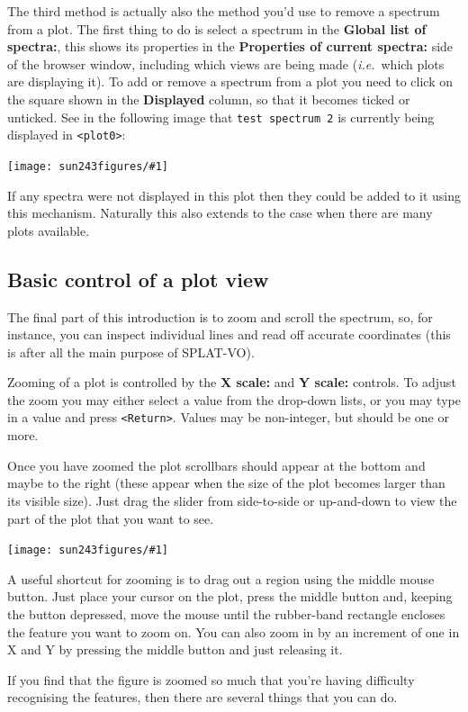 \documentclass[twoside,11pt]{article}
\newcommand{\htmladdimg}[1]{}
\newcommand{\latexhtml}[2]{#1}
\newcommand{\xlabel}[1]{}
\renewcommand{\_}{\texttt{\symbol{95}}}
\newcommand{\SPLAT}{\textsf{SPLAT-VO}}
\newcommand{\mainfigure}[1]
{\begin{center}
 \latexhtml{\texttt{[image: sun243\_figures/\#1]}}{\htmladdimg{#1.gif}}
 \end{center}
}
\newcommand{\labelitem}[1]{\textbf{#1}}
\newcommand{\hitext}[1]{\texttt{#1}}
\newcommand{\ie}{\textit{i.e.}}
\begin{document}
The third method is actually also the method you'd use to remove a
spectrum from a plot. The first thing to do is select a spectrum in the
\labelitem{Global list of spectra:},
this shows its properties in the
\labelitem{Properties of current spectra:}
side of the browser window, including which views
are being made (\ie\ which plots are displaying it). To add or remove
a spectrum from a plot you need to click on the square shown in the
\labelitem{Displayed} column, so that it becomes ticked or unticked. See
in the following image that \hitext{test spectrum 2} is currently
being displayed in \hitext{<plot0>}:

\mainfigure{browser4}

If any spectra were not displayed in this plot then they could be
added to it using this mechanism. Naturally this also extends to the
case when there are many plots available.

\newpage
\subsection{Basic control of a plot view\xlabel{basic_control}}

The final part of this introduction is to zoom and scroll the
spectrum, so, for instance, you can inspect individual lines and read
off accurate coordinates (this is after all the main purpose of
\SPLAT).

Zooming of a plot is controlled by the \labelitem{X scale:} and
\labelitem{Y scale:} controls. To adjust the zoom you may either select a
value from the drop-down lists, or you may type in a value and press
\hitext{<Return>}. Values may be non-integer, but should be one or more.

Once you have zoomed the plot scrollbars should appear at the bottom
and maybe to the right (these appear when the size of the plot becomes
larger than its visible size). Just drag the slider from side-to-side
or up-and-down to view the part of the plot that you want to see.

\mainfigure{plot4}

A useful shortcut for zooming is to drag out a region using the middle
mouse button. Just place your cursor on the plot, press the middle
button and, keeping the button depressed, move the mouse until the
rubber-band rectangle encloses the feature you want to zoom on. You
can also zoom in by an increment of one in X and Y by pressing the
middle button and just releasing it.

If you find that the figure is zoomed so much that you're having
difficulty recognising the features, then there are several things
that you can do.
\end{document}
